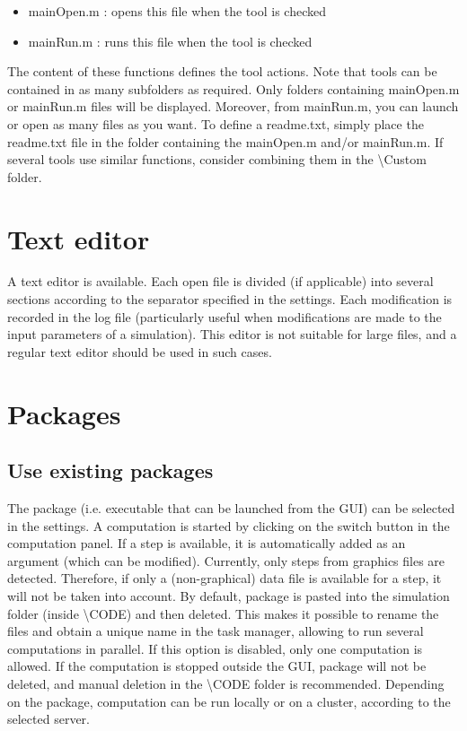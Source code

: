 \documentclass{article}
\begin{document}
\begin{itemize}
    \item mainOpen.m : opens this file when the tool is checked
    \item mainRun.m : runs this file when the tool is checked
\end{itemize}

The content of these functions defines the tool actions. Note that tools can be contained in as many subfolders as required. Only folders containing mainOpen.m or mainRun.m files will be displayed. Moreover, from mainRun.m, you can launch or open as many files as you want. To define a readme.txt, simply place the readme.txt file in the folder containing the mainOpen.m and/or mainRun.m. If several tools use similar functions, consider combining them in the \textbackslash Custom folder.

\section{Text editor}

A text editor is available. Each open file is divided (if applicable) into several sections according to the separator specified in the settings. Each modification is recorded in the log file (particularly useful when modifications are made to the input parameters of a simulation). This editor is not suitable for large files, and a regular text editor should be used in such cases.

\section{Packages}

\subsection{Use existing packages}

The package (i.e. executable that can be launched from the GUI) can be selected in the settings. A computation is started by clicking on the switch button in the computation panel. If a step is available, it is automatically added as an argument (which can be modified). Currently, only steps from graphics files are detected. Therefore, if only a (non-graphical) data file is available for a step, it will not be taken into account. By default, package is pasted into the simulation folder (inside \textbackslash CODE) and then deleted. This makes it possible to rename the files and obtain a unique name in the task manager, allowing to run several computations in parallel. If this option is disabled, only one computation is allowed. If the computation is stopped outside the GUI, package will not be deleted, and manual deletion in the \textbackslash CODE folder is recommended. Depending on the package, computation can be run locally or on a cluster, according to the selected server.
\end{document}
